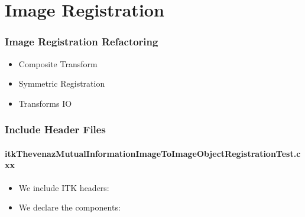 \section{Image Registration}


\begin{frame}
\frametitle{Image Registration Refactoring}
\Huge
\begin{itemize}
\item Composite Transform
\pause
\item Symmetric Registration
\pause
\item Transforms IO
\end{itemize}
\end{frame}



\begin{frame}
\frametitle{Include Header Files}
\framesubtitle{itkThevenazMutualInformationImageToImageObjectRegistrationTest.cxx}
\begin{itemize}
\item We include ITK headers:
\item We declare the components:
\end{itemize}
\end{frame}



